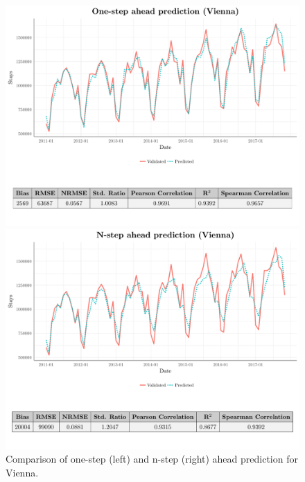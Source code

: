 \documentclass[a4paper,reqno,]{article}
\begin{document}
\begin{figure}[h!]
\centering
\begin{minipage}[h!]{0.49\textwidth}
\centering
    \includegraphics[width=1\textwidth]{images/RFR/Vienna_one_step_ahead_2.pdf}
\end{minipage}
\hspace{0.1cm}
\begin{minipage}[h!]{0.49\textwidth}
\centering
    \includegraphics[width=1\textwidth]{images/RFR/Vienna_n_step_ahead.pdf}
\end{minipage}
    \caption{Comparison of one-step (left) and n-step (right) ahead prediction for Vienna.}
	 \label{fig:rfr_one_n_step_vienna}
\end{figure} 
\end{document}
